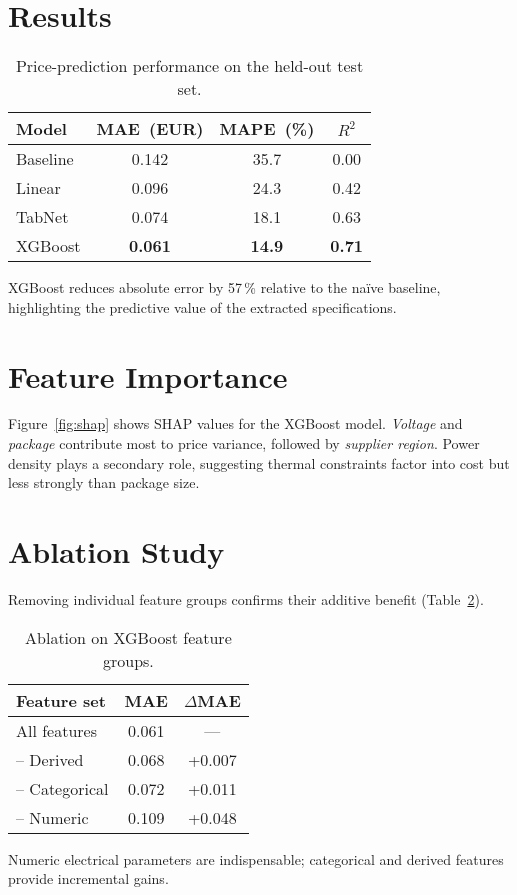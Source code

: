 \section{Results}
\begin{table}[H]
\centering
\caption{Price-prediction performance on the held-out test set.}
\label{tab:cost}
\begin{tabular}{lccc}
\toprule
Model & MAE~(EUR) & MAPE~(\%) & $R^{2}$ \\
\midrule
Baseline  & 0.142 & 35.7 & 0.00 \\
Linear    & 0.096 & 24.3 & 0.42 \\
TabNet    & 0.074 & 18.1 & 0.63 \\
XGBoost   & \textbf{0.061} & \textbf{14.9} & \textbf{0.71} \\
\bottomrule
\end{tabular}
\end{table}
XGBoost reduces absolute error by 57\,\% relative to the naïve baseline, highlighting the predictive value of the extracted specifications.

\section{Feature Importance}
Figure~\ref{fig:shap} shows SHAP values for the XGBoost model.  \textit{Voltage} and \textit{package} contribute most to price variance, followed by \textit{supplier region}.  Power density plays a secondary role, suggesting thermal constraints factor into cost but less strongly than package size.

\section{Ablation Study}
Removing individual feature groups confirms their additive benefit (Table~\ref{tab:ablation-cost}).
\begin{table}[H]
\centering
\caption{Ablation on XGBoost feature groups.}
\label{tab:ablation-cost}
\begin{tabular}{lcc}
\toprule
Feature set & MAE & $\Delta$MAE \\
\midrule
All features & 0.061 & --- \\
-- Derived    & 0.068 & +0.007 \\
-- Categorical & 0.072 & +0.011 \\
-- Numeric     & 0.109 & +0.048 \\
\bottomrule
\end{tabular}
\end{table}
Numeric electrical parameters are indispensable; categorical and derived features provide incremental gains.

